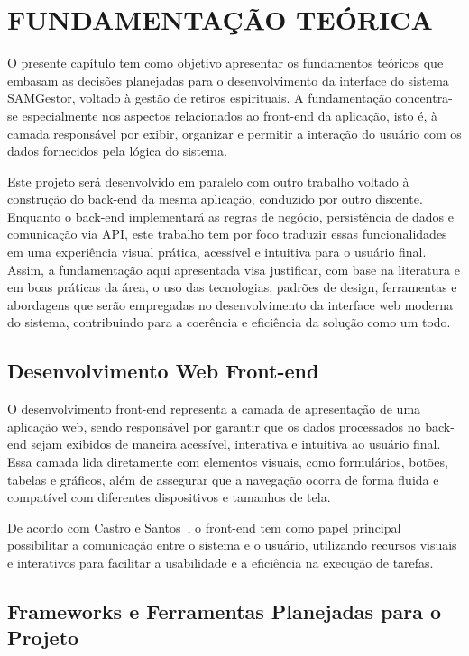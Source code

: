 \chapter{FUNDAMENTAÇÃO TEÓRICA}

O presente capítulo tem como objetivo apresentar os fundamentos teóricos que embasam as decisões planejadas para o desenvolvimento da interface do sistema SAMGestor, voltado à gestão de retiros espirituais. A fundamentação concentra-se especialmente nos aspectos relacionados ao front-end da aplicação, isto é, à camada responsável por exibir, organizar e permitir a interação do usuário com os dados fornecidos pela lógica do sistema.

Este projeto será desenvolvido em paralelo com outro trabalho voltado à construção do back-end da mesma aplicação, conduzido por outro discente. Enquanto o back-end implementará as regras de negócio, persistência de dados e comunicação via API, este trabalho tem por foco traduzir essas funcionalidades em uma experiência visual prática, acessível e intuitiva para o usuário final. Assim, a fundamentação aqui apresentada visa justificar, com base na literatura e em boas práticas da área, o uso das tecnologias, padrões de design, ferramentas e abordagens que serão empregadas no desenvolvimento da interface web moderna do sistema, contribuindo para a coerência e eficiência da solução como um todo.

\section{Desenvolvimento Web Front-end}

O desenvolvimento front-end representa a camada de apresentação de uma aplicação web, sendo responsável por garantir que os dados processados no back-end sejam exibidos de maneira acessível, interativa e intuitiva ao usuário final. Essa camada lida diretamente com elementos visuais, como formulários, botões, tabelas e gráficos, além de assegurar que a navegação ocorra de forma fluida e compatível com diferentes dispositivos e tamanhos de tela.

De acordo com Castro e Santos~\cite{castro2019}, o front-end tem como papel principal possibilitar a comunicação entre o sistema e o usuário, utilizando recursos visuais e interativos para facilitar a usabilidade e a eficiência na execução de tarefas.

\section{Frameworks e Ferramentas Planejadas para o Projeto}

